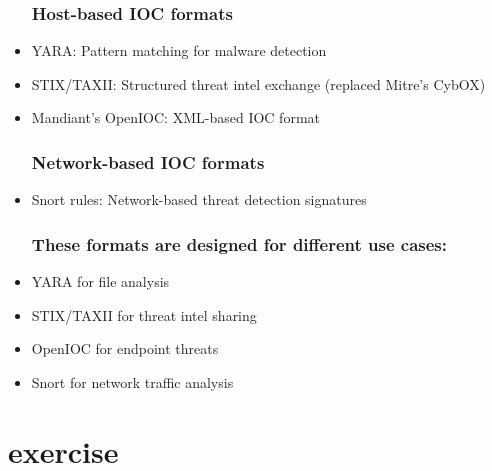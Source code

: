 \begin{itemize}
  \subsubsection*{Host-based IOC formats}
  \item YARA: Pattern matching for malware detection
  \item STIX/TAXII: Structured threat intel exchange (replaced Mitre's CybOX)
  \item Mandiant's OpenIOC: XML-based IOC format
  \subsubsection*{Network-based IOC formats}
  \item Snort rules: Network-based threat detection signatures
  \subsubsection*{These formats are designed for different use cases:}
  \item YARA for file analysis
  \item STIX/TAXII for threat intel sharing
  \item OpenIOC for endpoint threats
  \item Snort for network traffic analysis
\end{itemize}

\section{exercise}
